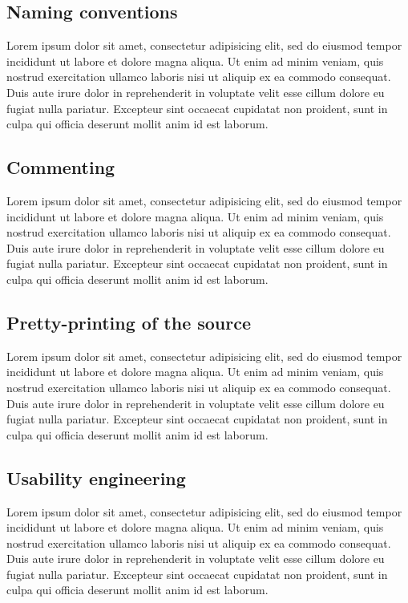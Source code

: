 \documentclass[12pt,a4paper]{article}
\begin{document}
\subsection{Naming conventions}
Lorem ipsum dolor sit amet, consectetur adipisicing elit, sed do eiusmod tempor incididunt ut labore et dolore magna aliqua. Ut enim ad minim veniam, quis nostrud exercitation ullamco laboris nisi ut aliquip ex ea commodo consequat. Duis aute irure dolor in reprehenderit in voluptate velit esse cillum dolore eu fugiat nulla pariatur. Excepteur sint occaecat cupidatat non proident, sunt in culpa qui officia deserunt mollit anim id est laborum.

\subsection{Commenting}
Lorem ipsum dolor sit amet, consectetur adipisicing elit, sed do eiusmod tempor incididunt ut labore et dolore magna aliqua. Ut enim ad minim veniam, quis nostrud exercitation ullamco laboris nisi ut aliquip ex ea commodo consequat. Duis aute irure dolor in reprehenderit in voluptate velit esse cillum dolore eu fugiat nulla pariatur. Excepteur sint occaecat cupidatat non proident, sunt in culpa qui officia deserunt mollit anim id est laborum.

\subsection{Pretty-printing of the source}
Lorem ipsum dolor sit amet, consectetur adipisicing elit, sed do eiusmod tempor incididunt ut labore et dolore magna aliqua. Ut enim ad minim veniam, quis nostrud exercitation ullamco laboris nisi ut aliquip ex ea commodo consequat. Duis aute irure dolor in reprehenderit in voluptate velit esse cillum dolore eu fugiat nulla pariatur. Excepteur sint occaecat cupidatat non proident, sunt in culpa qui officia deserunt mollit anim id est laborum.

\subsection{Usability engineering}
Lorem ipsum dolor sit amet, consectetur adipisicing elit, sed do eiusmod tempor incididunt ut labore et dolore magna aliqua. Ut enim ad minim veniam, quis nostrud exercitation ullamco laboris nisi ut aliquip ex ea commodo consequat. Duis aute irure dolor in reprehenderit in voluptate velit esse cillum dolore eu fugiat nulla pariatur. Excepteur sint occaecat cupidatat non proident, sunt in culpa qui officia deserunt mollit anim id est laborum.
\end{document}
